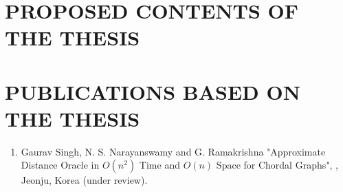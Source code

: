 \documentclass[MS,synopsis]{iitmdiss}
\begin{document}
  
 

\section{PROPOSED CONTENTS OF THE THESIS}



\section{PUBLICATIONS BASED ON THE THESIS}

\begin{enumerate}  
 \item Gaurav Singh, N. S. Narayanswamy and G. Ramakrishna \newblock
  "Approximate Distance Oracle in $O(n^2)$ Time and $O(n)$ Space for Chordal Graphs", , Jeonju, Korea (under review).
\end{enumerate}

% 	
% 	
 \pagebreak
\nocite{*}
\renewcommand\refname{REFERENCES}



\end{document}
